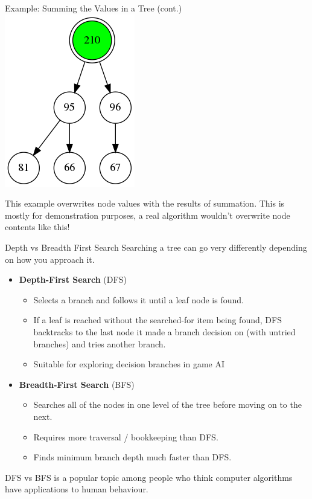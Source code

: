 \documentclass[11pt]{beamer}
\begin{document}
\begin{frame}{Example: Summing the Values in a Tree (cont.)}
\includegraphics[scale=0.28]{graphs/summing_tree_10.png}

This example overwrites node values with the results of summation.  This is mostly for demonstration purposes, a real algorithm wouldn't overwrite node contents like this! 
\end{frame}

\begin{frame}{Depth vs Breadth First Search}
Searching a tree can go very differently depending on how you approach it.
\begin{itemize}
\item \textbf{Depth-First Search} (DFS)
\begin{itemize}
\item Selects a branch and follows it until a leaf node is found.
\item If a leaf is reached without the searched-for item being found, DFS backtracks to the last node it made a branch decision on (with untried branches) and tries another branch.
\item Suitable for exploring decision branches in game AI
\end{itemize}
\item \textbf{Breadth-First Search} (BFS)
\begin{itemize}
\item Searches all of the nodes in one level of the tree before moving on to the next.  
\item Requires more traversal / bookkeeping than DFS.
\item Finds minimum branch depth much faster than DFS.  
\end{itemize}
\end{itemize}
DFS vs BFS is a popular topic among people who think computer algorithms have applications to human behaviour.  
\end{frame}
\end{document}

